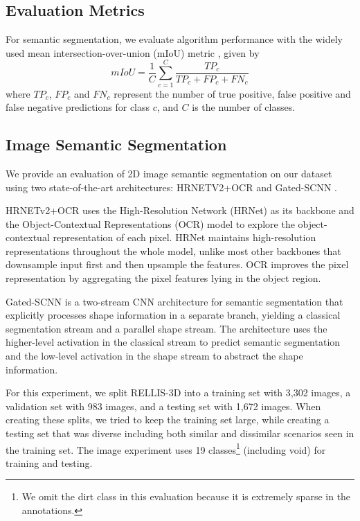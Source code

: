 \documentclass[letterpaper, 10 pt, conference]{ieeeconf}
\begin{document}
 \subsection{Evaluation Metrics}
For semantic segmentation, we evaluate algorithm performance with the widely used mean intersection-over-union (mIoU) metric \cite{Everingham2014}, given by
\begin{equation}
    mIoU=\frac{1}{C}\sum_{c=1}^{C}\frac{TP_c}{TP_c+FP_c+FN_c}
\end{equation}
where \(TP_c\), \(FP_c\) and \(FN_c\) represent the number of true positive, false positive and false negative predictions for class \(c\), and \(C\) is the number of classes.

\subsection{Image Semantic Segmentation}
We provide an evaluation of 2D image semantic segmentation on our dataset using two state-of-the-art architectures: HRNETV2+OCR \cite{WangSCJDZLMTWLX19, Yuan2019} and Gated-SCNN \cite{Takikawa2019}.

 HRNETv2+OCR uses the High-Resolution Network (HRNet)\cite{WangSCJDZLMTWLX19} as its backbone and the Object-Contextual Representations (OCR) model \cite{Yuan2019} to explore the object-contextual representation of each pixel. HRNet maintains high-resolution representations throughout the whole model, unlike most other backbones that downsample input first and then upsample the features. OCR improves the pixel representation by aggregating the pixel features lying in the object region. 

Gated-SCNN\cite{Takikawa2019} is a two-stream CNN architecture for semantic segmentation that explicitly processes shape information in a separate branch, yielding a classical segmentation stream and a parallel shape stream. The architecture uses the higher-level activation in the classical stream to predict semantic segmentation and the low-level activation in the shape stream to abstract the shape information.

For this experiment, we split RELLIS-3D into a training set with 3,302 images, a validation set with 983 images, and a testing set with 1,672 images. When creating these splits, we tried to keep the training set large, while creating a testing set that was diverse including both similar and dissimilar scenarios seen in the training set. The image experiment uses 19 classes\footnote{We omit the dirt class in this evaluation because it is extremely sparse in the annotations.} (including void) for training and testing.
\end{document}
